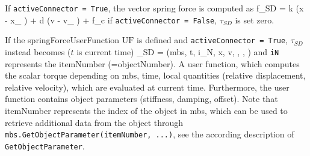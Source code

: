     If \texttt{activeConnector = True}, the vector spring force is computed as
    \be
      f_{SD} = k \left(\Delta x - x_ \right) + d \left(\Delta v - v_ \right) + f_c
    \ee
    if \texttt{activeConnector = False}, $\tau_{SD}$ is set zero.

    If the springForceUserFunction $\mathrm{UF}$ is defined and \texttt{activeConnector = True}, 
	$\tau_{SD}$ instead becomes ($t$ is current time)
    \be
      \tau_{SD} = (mbs, t, i_N, \Delta x, \Delta v, , , )
    \ee
    and \texttt{iN} represents the itemNumber (=objectNumber).
    A user function, which computes the scalar torque depending on mbs, time, local quantities 
	(relative displacement, relative velocity), which are evaluated at current time. 
	Furthermore, the user function contains object parameters (stiffness, damping, offset).
    Note that itemNumber represents the index of the object in mbs, which can be used to retrieve additional data from the object through
    \texttt{mbs.GetObjectParameter(itemNumber, ...)}, see the according description of \texttt{GetObjectParameter}.
    
